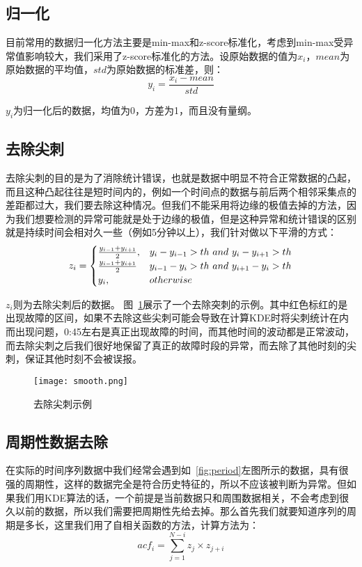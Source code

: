 \subsection{归一化}
目前常用的数据归一化方法主要是min-max和z-score标准化，考虑到min-max受异常值影响较大，我们采用了z-score标准化的方法。设原始数据的值为$x_i$，$mean$为原始数据的平均值，$std$为原始数据的标准差，则：
\begin{equation}
y_i = \frac{x_i-mean}{std}
\end{equation}

$y_i$为归一化后的数据，均值为0，方差为1，而且没有量纲。
\subsection{去除尖刺}
去除尖刺的目的是为了消除统计错误，也就是数据中明显不符合正常数据的凸起，而且这种凸起往往是短时间内的，例如一个时间点的数据与前后两个相邻采集点的差距都过大，我们要去除这种情况。但我们不能采用将边缘的极值去掉的方法，因为我们想要检测的异常可能就是处于边缘的极值，但是这种异常和统计错误的区别就是持续时间会相对久一些（例如5分钟以上），我们针对做以下平滑的方式：
\begin{equation}
z_i = \begin{cases} \frac{y_{i-1} + y_{i+1}}{2}, & y_i - y_{i-1} > th\ and\ y_i - y_{i+1} > th \cr \frac{y_{i-1} + y_{i+1}}{2} & y_{i-1} - y_i > th\ and\ y_{i+1} - y_i > th \cr y_i, & otherwise  \end{cases}
\end{equation}

$z_i$则为去除尖刺后的数据。
图~\ref{fig:smooth}展示了一个去除突刺的示例。其中红色标红的是出现故障的区间，如果不去除这些尖刺可能会导致在计算KDE时将尖刺统计在内而出现问题，0:45左右是真正出现故障的时间，而其他时间的波动都是正常波动，而去除尖刺之后我们很好地保留了真正的故障时段的异常，而去除了其他时刻的尖刺，保证其他时刻不会被误报。

\begin{figure}[htbp]
  \centering
  \texttt{[image: smooth.png]}
  \caption{去除尖刺示例}
  \label{fig:smooth}
\end{figure}
\subsection{周期性数据去除}

在实际的时间序列数据中我们经常会遇到如~\ref{fig:period}左图所示的数据，具有很强的周期性，这样的数据完全是符合历史特征的，所以不应该被判断为异常。但如果我们用KDE算法的话，一个前提是当前数据只和周围数据相关，不会考虑到很久以前的数据，所以我们需要把周期性先给去掉。那么首先我们就要知道序列的周期是多长，这里我们用了自相关函数的方法，计算方法为：
\begin{equation}
  acf_i = \sum_{j=1}^{N-i}z_j\times z_{j+i}
\end{equation}

